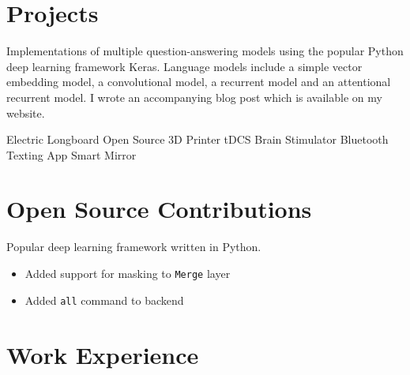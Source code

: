 \documentclass[letterpaper]{deedy-resume} %
\begin{document}
%
\begin{minipage}[t]{0.66\textwidth} %

\section{Projects}

\vspace{2mm}


\vspace{1mm}

Implementations of multiple question-answering models using the popular Python deep learning framework Keras. Language models include a simple vector embedding model, a convolutional model, a recurrent model and an attentional recurrent model. I wrote an accompanying blog post which is available on my website.

\sectionspace

Electric Longboard \textbullet{} Open Source 3D Printer \textbullet{} tDCS Brain Stimulator \textbullet{} Bluetooth Texting App\textbullet{} Smart Mirror

\section{Open Source Contributions}


Popular deep learning framework written in Python.

\begin{itemize}
	\item{Added support for masking to \texttt{Merge} layer}
	\item{Added \texttt{all} command to backend}
\end{itemize}

\sectionspace


\section{Work Experience}



\end{minipage}
\end{document}

